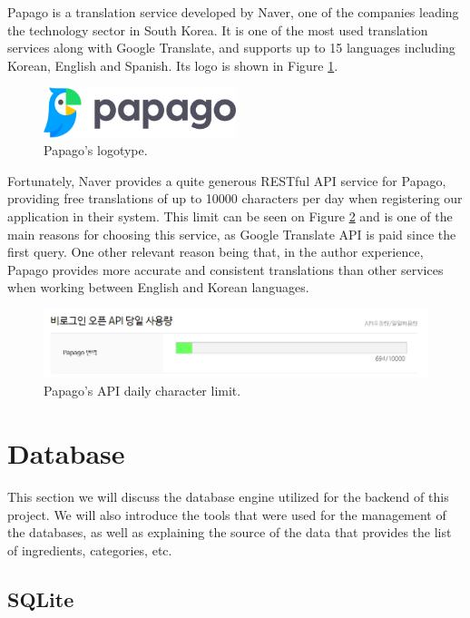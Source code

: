 Papago is a translation service developed by Naver, one of the companies leading the technology sector in South Korea. It is one of the most used translation services along with Google Translate, and supports up to 15 languages including Korean, English and Spanish. Its logo is shown in Figure \ref{fig:papago}.

\begin{figure}[h]
  \centering
  \includegraphics[width=0.5\textwidth]{Figures/papago.png}
  \caption{%
    Papago's logotype.
  }
  \label{fig:papago}
\end{figure}

Fortunately, Naver provides a quite generous RESTful API service for Papago, providing free translations of up to 10000 characters per day when registering our application in their system. This limit can be seen on Figure \ref{fig:papago-limit} and is one of the main reasons for choosing this service, as Google Translate API is paid since the first query. One other relevant reason being that, in the author experience, Papago provides more accurate and consistent translations than other services when working between English and Korean languages.

\begin{figure}[h]
  \centering
  \includegraphics[width=\textwidth]{Figures/papago-limit.png}
  \caption{%
    Papago's API daily character limit.
  }
  \label{fig:papago-limit}
\end{figure}

\section{Database}

This section we will discuss the database engine utilized for the backend of this project. We will also introduce the tools that were used for the management of the databases, as well as explaining the source of the data that provides the list of ingredients, categories, etc.

\subsection{SQLite}

